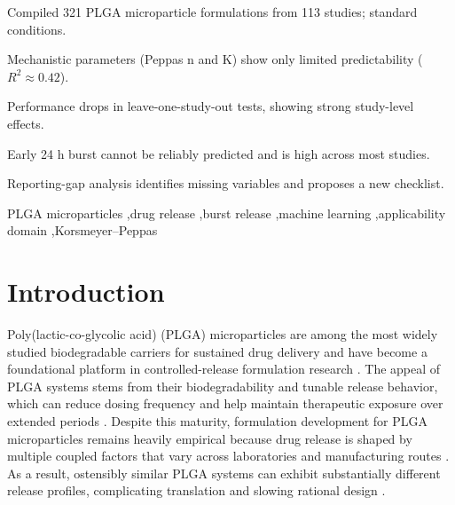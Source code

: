 \documentclass[preprint,12pt,authoryear]{elsarticle}
\begin{document}
\begin{frontmatter}
\begin{highlights}
\item Compiled 321 PLGA microparticle formulations from 113 studies; standard conditions.
\item Mechanistic parameters (Peppas n and K) show only limited predictability ($R^2 \approx 0.42$).
\item Performance drops in leave-one-study-out tests, showing strong study-level effects.
\item Early 24 h burst cannot be reliably predicted and is high across most studies.
\item Reporting-gap analysis identifies missing variables and proposes a new checklist.
\end{highlights}

\begin{keyword}
PLGA microparticles \sep drug release \sep burst release \sep machine learning \sep applicability domain \sep Korsmeyer--Peppas
\end{keyword}

\end{frontmatter}

\section{Introduction}

Poly(lactic-co-glycolic acid) (PLGA) microparticles are among the most widely studied biodegradable carriers for sustained drug delivery and have become a foundational platform in controlled-release formulation research \citep{MakadiaSiegel2011,FreibergZhu2004}. The appeal of PLGA systems stems from their biodegradability and tunable release behavior, which can reduce dosing frequency and help maintain therapeutic exposure over extended periods \citep{MakadiaSiegel2011,Fredenberg2011}. Despite this maturity, formulation development for PLGA microparticles remains heavily empirical because drug release is shaped by multiple coupled factors that vary across laboratories and manufacturing routes \citep{Fredenberg2011,Jain2000}. As a result, ostensibly similar PLGA systems can exhibit substantially different release profiles, complicating translation and slowing rational design \citep{Fredenberg2011}.
\end{document}
